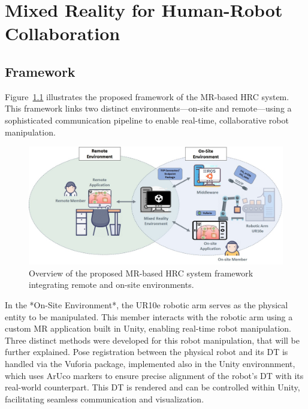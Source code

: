 \chapter{Mixed Reality for Human-Robot Collaboration}%
\label{chapter:on-site}


\section{Framework}

Figure~\ref{fig:project_framework} illustrates the  proposed framework of the \ac{MR}-based \ac{HRC} system. This framework links two distinct environments—on-site and remote—using a sophisticated communication pipeline to enable real-time, collaborative robot manipulation.

\begin{figure}[h]
    \centering
    \includegraphics[width=\linewidth]{figs/framework-1.jpeg}
    \caption{Overview of the proposed \ac{MR}-based \ac{HRC} system framework integrating remote and on-site environments.}
    \label{fig:project_framework}
\end{figure}


In the *On-Site Environment*, the UR10e robotic arm serves as the physical entity to be manipulated.
This member interacts with the robotic arm using a custom \ac{MR} application built in Unity, enabling real-time robot manipulation. Three distinct methods were developed for this robot manipulation, that will be further explained. Pose registration between the physical robot and its \ac{DT} is handled via the Vuforia package, implemented also in the Unity environnment, which uses ArUco markers to ensure precise alignment of the robot’s \ac{DT} with its real-world counterpart. This \ac{DT} is rendered and can be controlled within Unity, facilitating seamless communication and visualization.

